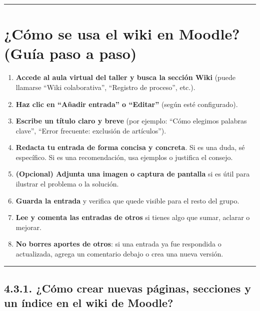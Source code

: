 \documentclass[
  letterpaper,
]{book}
\providecommand{\tightlist}{%
  \setlength{\itemsep}{0pt}\setlength{\parskip}{0pt}}\usepackage{longtable,booktabs,array}
\begin{document}
\begin{center}\rule{0.5\linewidth}{0.5pt}\end{center}

\section{¿Cómo se usa el wiki en Moodle? (Guía paso a
paso)}\label{cuxf3mo-se-usa-el-wiki-en-moodle-guuxeda-paso-a-paso}

\begin{enumerate}
\def\labelenumi{\arabic{enumi}.}
\tightlist
\item
  \textbf{Accede al aula virtual del taller y busca la sección Wiki}
  (puede llamarse ``Wiki colaborativa'', ``Registro de proceso'', etc.).
\item
  \textbf{Haz clic en ``Añadir entrada'' o ``Editar''} (según esté
  configurado).
\item
  \textbf{Escribe un título claro y breve} (por ejemplo: ``Cómo elegimos
  palabras clave'', ``Error frecuente: exclusión de artículos'').
\item
  \textbf{Redacta tu entrada de forma concisa y concreta}. Si es una
  duda, sé específico. Si es una recomendación, usa ejemplos o justifica
  el consejo.
\item
  \textbf{(Opcional) Adjunta una imagen o captura de pantalla} si es
  útil para ilustrar el problema o la solución.
\item
  \textbf{Guarda la entrada} y verifica que quede visible para el resto
  del grupo.
\item
  \textbf{Lee y comenta las entradas de otros} si tienes algo que sumar,
  aclarar o mejorar.
\item
  \textbf{No borres aportes de otros}: si una entrada ya fue respondida
  o actualizada, agrega un comentario debajo o crea una nueva versión.
\end{enumerate}

\begin{center}\rule{0.5\linewidth}{0.5pt}\end{center}

\subsection{4.3.1. ¿Cómo crear nuevas páginas, secciones y un índice en
el wiki de
Moodle?}\label{cuxf3mo-crear-nuevas-puxe1ginas-secciones-y-un-uxedndice-en-el-wiki-de-moodle}
\end{document}
